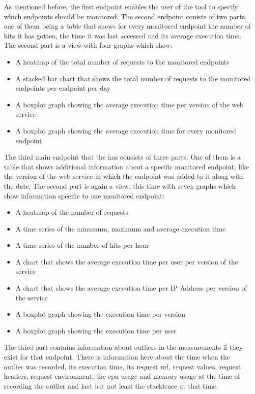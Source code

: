 \documentclass[conference]{IEEEtran}
\begin{document}
As mentioned before, the first endpoint enables the user of the tool to specify which endpoints should be monitored. The second endpoint conists of two parts, one of them being a table that shows for every monitored endpoint the number of hits it has gotten, the time it was last accessed and its average execution time. The second part is a view with four graphs which show:
\begin{itemize} 
  \item A heatmap of the total number of requests to the monitored endpoints
  \item A stacked bar chart that shows the total number of requests to the monitored endpoints per endpoint per day
  \item A boxplot graph showing the average execution time per version of the web service
  \item A boxplot graph showing the average execution time for every monitored endpoint
\end{itemize}

The third main endpoint that the \tool has consists of three parts. One of them is a table that shows additional information about a specific monitored endpoint, like the version of the web service in which the endpoint was added to it along with the date. The second part is again a view, this time with seven graphs which show information specific to one monitored endpoint:
\begin{itemize} 
  \item A heatmap of the number of requests
  \item A time series of the minumum, maximum and average execution time
  \item A time series of the number of hits per hour 
  \item A chart that shows the average execution time per user per version of the service
  \item A chart that shows the average execution time per IP Address per version of the service
  \item A boxplot graph showing the execution time per version
  \item A boxplot graph showing the execution time per user
\end{itemize}
The third part contains information about outliers in the measurements if they exist for that endpoint. There is information here about the time when the outlier was recorded, its execution time, its request url, request values, request headers, request environment, the cpu usage and memory usage at the time of recording the outlier and last but not least the stacktrace at that time. 
\end{document}
